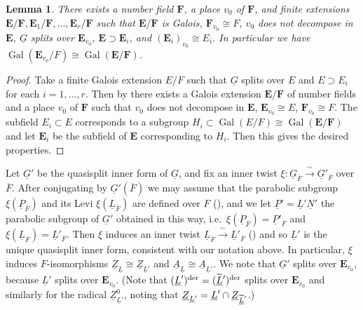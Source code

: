 \documentclass[a4paper]{amsart}
\numberwithin{equation}{section}
\newtheorem{lem}[thm]{Lemma}
\theoremstyle{remark}
\theoremstyle{definition}
\DeclareMathOperator{\Gal}{Gal}
\newcommand{\alggrp}[1]{\underline{#1}}
\newcommand{\der}{\mathrm{der}}
\newcommand{\glob}[1]{\boldsymbol{#1}}
\newcommand{\congto}{\xrightarrow{\,\sim\,}}
\renewcommand{\simeq}{\cong}
\newcommand{\lowprime}[1][\prime]{
  \mathchoice
    {\raisebox{-0.7ex}{$\scriptstyle #1$}}
    {\raisebox{-0.7ex}{$\scriptstyle #1$}}
    {\raisebox{-0.7ex}{$\scriptstyle #1$}}
    {\raisebox{-0.3ex}{$\scriptscriptstyle #1$}}
}
\renewcommand{\o}[1]{\overline{#1}}
\begin{document}
\begin{lem}\label{lem:global-fields}
There exists a number field $\glob{F}$, a place $v_{0}$ of $\glob{F}$, and finite extensions $\glob{E}/\glob{F},\glob{E}_{1}/\glob{F},\ldots,\glob{E}_{r}/\glob{F}$ such that $\glob{E}/\glob{F}$ is Galois, $\glob{F}_{v_{0}}\simeq F$, $v_{0}$ does not decompose in $\glob{E}$, $\alggrp{G}$ splits over $\glob{E}_{v_{0}}$, $\glob{E}\supset \glob{E}_{i}$, and $(\glob{E}_{i})_{v_{0}}\simeq E_{i}$.
In particular we have $\Gal(\glob{E}_{v_{0}}/F)\simeq\Gal(\glob{E}/\glob{F})$.
\end{lem}
\begin{proof}
Take a finite Galois extension $E/F$ such that $\alggrp{G}$ splits over $E$ and $E\supset E_{i}$ for each $i = 1,\ldots,r$.
Then by \cite[Lemma~3.1]{MR3861809} there exists a Galois extension $\glob{E}/\glob{F}$ of number fields and a place $v_{0}$ of $\glob{F}$ such that $v_{0}$ does not decompose in $\glob{E}$, $\glob{E}_{v_{0}}\simeq E$, $\glob{F}_{v_{0}}\simeq F$.
The subfield $E_{i}\subset E$ corresponds to a subgroup $H_{i}\subset \Gal(E/F)\simeq \Gal(\glob{E}/\glob{F})$ and let $\glob{E}_{i}$ be the subfield of $\glob{E}$ corresponding to $H_{i}$.
Then this gives the desired properties.
\end{proof}
Let $\alggrp{G}'$ be the quasisplit inner form of $\alggrp{G}$, and fix an inner twist $\xi \colon \alggrp G_{\o F} \congto \alggrp G'_{\o F}$ over $\o F$.
After conjugating by $\alggrp G'(\o F)$ we may assume that the parabolic subgroup $\xi(\alggrp P_{\o F})$ and its Levi $\xi(\alggrp L_{\o F})$ are defined over $F$ (\cite[Lemma 3]{MR4048514}), and we let $\alggrp{P}' = \alggrp{L}'\alggrp{N}'$ the parabolic subgroup of $\alggrp G'$ obtained in this way, i.e.\ $\xi(\alggrp P_{\o F}) = \alggrp{P}'_{\o F}$ and $\xi(\alggrp L_{\o F}) = \alggrp{L}'_{\o F}$.
Then $\xi$ induces an inner twist $\alggrp L_{\o F} \congto \alggrp L'_{\o F}$ (\cite[Lemma 3]{MR4048514}) and so $\alggrp L'$ is the unique quasisplit inner form, consistent with our notation above.
In particular, $\xi$ induces $F$-isomorphisms $\alggrp Z_{\alggrp L} \cong \alggrp Z_{\alggrp L'}$ and $\alggrp A_{\alggrp L} \cong \alggrp A_{\alggrp L'}$.
We note that $\alggrp{G}'$ splits over $\glob{E}_{v_{0}}$, because $\alggrp{L}'$ splits over $\glob{E}_{v_{0}}$.
(Note that $(\alggrp{L}')^\der = (\widetilde{\alggrp{L}}^{\lowprime})^{\der}$ splits over $\glob{E}_{v_{0}}$ and similarly for the radical $\alggrp{Z}_{\alggrp{L}'}^0$, noting that $\alggrp{Z}_{\alggrp{L}'} = \alggrp{L}'\cap \alggrp{Z}_{\widetilde{\alggrp{L}}^{\lowprime}}$.)
\end{document}
